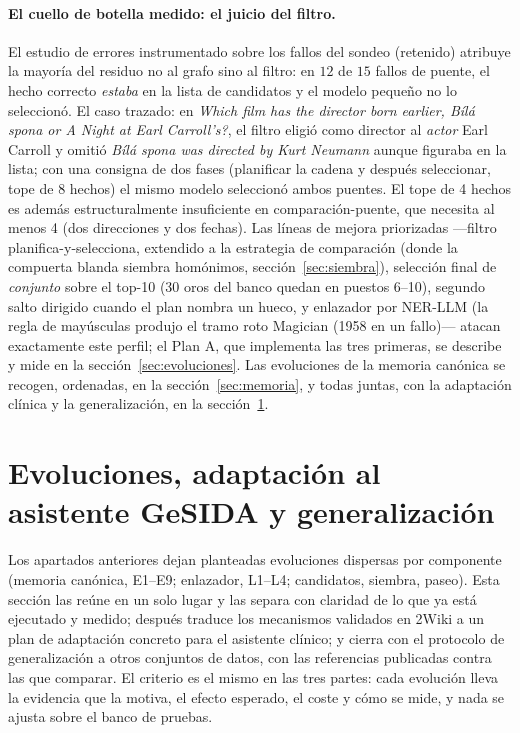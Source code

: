 \documentclass[11pt,a4paper]{article}
\begin{document}
\paragraph{El cuello de botella medido: el juicio del filtro.}
El estudio de errores instrumentado sobre los fallos del sondeo (retenido)
atribuye la mayoría del residuo no al grafo sino al filtro: en $12$ de $15$
fallos de puente, el hecho correcto \emph{estaba} en la lista de candidatos
y el modelo pequeño no lo seleccionó. El caso trazado:
en \guillemotleft{}\emph{Which film has the director born earlier, Bílá spona or A Night
at Earl Carroll's?}\guillemotright{}, el filtro eligió como director al \emph{actor} Earl
Carroll y omitió \guillemotleft{}\emph{Bílá spona was directed by Kurt Neumann}\guillemotright{}
aunque figuraba en la lista; con una consigna de dos fases
(planificar la cadena y después seleccionar, tope de 8 hechos) el mismo
modelo seleccionó ambos puentes. El tope de 4 hechos es además
estructuralmente insuficiente en comparación-puente, que necesita al menos
4 (dos direcciones y dos fechas). Las líneas de mejora priorizadas
---filtro planifica-y-selecciona, extendido a la estrategia de comparación
(donde la compuerta blanda siembra homónimos, sección~\ref{sec:siembra}),
selección final de \emph{conjunto} sobre
el top-10 (30 oros del banco quedan en puestos 6--10), segundo salto
dirigido cuando el plan nombra un hueco, y enlazador por NER-LLM (la regla
de mayúsculas produjo el tramo roto \guillemotleft{}Magician (1958\guillemotright{} en un fallo)---
atacan exactamente este perfil; el Plan A, que implementa las tres
primeras, se describe y mide en la sección~\ref{sec:evoluciones}. Las
evoluciones de la memoria canónica se recogen, ordenadas, en la
sección~\ref{sec:memoria}, y todas juntas, con la adaptación clínica y la
generalización, en la sección~\ref{sec:futuro}.

\section{Evoluciones, adaptación al asistente GeSIDA y generalización}
\label{sec:futuro}

Los apartados anteriores dejan planteadas evoluciones dispersas por
componente (memoria canónica, E1--E9; enlazador, L1--L4; candidatos,
siembra, paseo). Esta sección las reúne en un solo lugar y las separa
con claridad de lo que ya está ejecutado y medido; después traduce los
mecanismos validados en 2Wiki a un plan de adaptación concreto para el
asistente clínico; y cierra con el protocolo de generalización a otros
conjuntos de datos, con las referencias publicadas contra las que
comparar. El criterio es el mismo en las tres partes: cada evolución
lleva la evidencia que la motiva, el efecto esperado, el coste y cómo se
mide, y nada se ajusta sobre el banco de pruebas.
\end{document}
